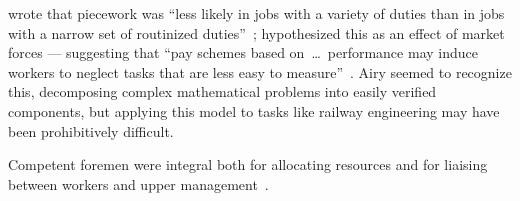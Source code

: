 \documentclass[trackingWork]{subfiles}
\begin{document}
\citeauthor{Brown01041990} wrote that piecework was
``less likely in jobs with a variety of duties than in
jobs with a narrow set of routinized duties''~\cite{Brown01041990};
\citeauthor{SJOE:SJOE371} hypothesized this as an effect of market forces
--- suggesting that
``pay schemes based on~\dots~performance may induce workers to neglect tasks that are less easy to measure''~\cite{SJOE:SJOE371}.
Airy seemed to recognize this,
decomposing complex mathematical problems into easily verified components, %
but applying this model to tasks like railway engineering may have been prohibitively difficult.

Competent foremen were integral both for allocating resources and
for liaising between workers and upper management~\cite{wray1949marginal,10.2307/2118435}.



\end{document}
